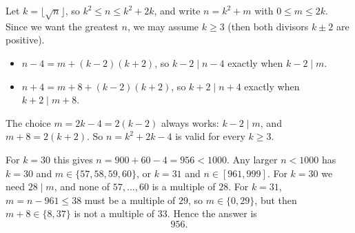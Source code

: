 Let $k=\lfloor\sqrt n\rfloor$, so $k^2\le n\le k^2+2k$, and write $n=k^2+m$ with $0\le m\le2k$. Since we want the greatest $n$, we may assume $k\ge3$ (then both divisors $k\pm2$ are positive).
\begin{itemize}
\item $n-4=m+(k-2)(k+2)$, so $k-2\mid n-4$ exactly when $k-2\mid m$.
\item $n+4=m+8+(k-2)(k+2)$, so $k+2\mid n+4$ exactly when $k+2\mid m+8$.
\end{itemize}
The choice $m=2k-4=2(k-2)$ always works: $k-2\mid m$, and $m+8=2(k+2)$. So $n=k^2+2k-4$ is valid for every $k\ge3$.

For $k=30$ this gives $n=900+60-4=956<1000$. Any larger $n<1000$ has $k=30$ and $m\in\{57,58,59,60\}$, or $k=31$ and $n\in[961,999]$. For $k=30$ we need $28\mid m$, and none of $57,\dots,60$ is a multiple of $28$. For $k=31$, $m=n-961\le38$ must be a multiple of $29$, so $m\in\{0,29\}$, but then $m+8\in\{8,37\}$ is not a multiple of $33$. Hence the answer is
\[\boxed{956}.\]
